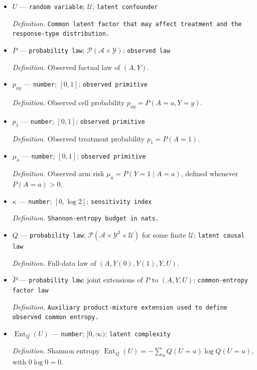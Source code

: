\documentclass{article}
\begin{document}
\begin{itemize}
  \item \(U\) --- \texttt{random variable}; \(\mathcal U\); \texttt{latent confounder}
  \par\smallskip\noindent\emph{Definition.} \texttt{Common latent factor that may affect treatment and the response-\allowbreak{}type distribution.}
  \item \(P\) --- \texttt{probability law}; \(\mathcal P(\mathcal A\times\mathcal Y)\); \texttt{observed law}
  \par\smallskip\noindent\emph{Definition.} Observed factual law of \((A,Y)\).
  \item \(p_{ay}\) --- \texttt{number}; \([0,1]\); \texttt{observed primitive}
  \par\smallskip\noindent\emph{Definition.} Observed cell probability \(p_{ay}=P(A=a,Y=y)\).
  \item \(p_1\) --- \texttt{number}; \([0,1]\); \texttt{observed primitive}
  \par\smallskip\noindent\emph{Definition.} Observed treatment probability \(p_1=P(A=1)\).
  \item \(\mu_a\) --- \texttt{number}; \([0,1]\); \texttt{observed primitive}
  \par\smallskip\noindent\emph{Definition.} Observed arm risk \(\mu_a=P(Y=1\mid A=a)\), defined whenever \(P(A=a)>0\).
  \item \(\kappa\) --- \texttt{number}; \([0,\log 2]\); \texttt{sensitivity index}
  \par\smallskip\noindent\emph{Definition.} \texttt{Shannon-\allowbreak{}entropy budget in nats.}
  \item \(Q\) --- \texttt{probability law}; \(\mathcal P(\mathcal A\times\mathcal Y^3\times\mathcal U)\) for some finite \(\mathcal U\); \texttt{latent causal law}
  \par\smallskip\noindent\emph{Definition.} Full-data law of \((A,Y(0),Y(1),Y,U)\).
  \item \(\widetilde P\) --- \texttt{probability law}; joint extensions of \(P\) to \((A,Y,U)\); \texttt{common-\allowbreak{}entropy factor law}
  \par\smallskip\noindent\emph{Definition.} \texttt{Auxiliary product-\allowbreak{}mixture extension used to define observed common entropy.}
  \item \(\operatorname{Ent}_Q(U)\) --- \texttt{number}; \([0,\infty)\); \texttt{latent complexity}
  \par\smallskip\noindent\emph{Definition.} Shannon entropy \(\operatorname{Ent}_Q(U)=-\sum_u Q(U=u)\log Q(U=u)\), with \(0\log 0=0\).

\end{itemize}
\end{document}
